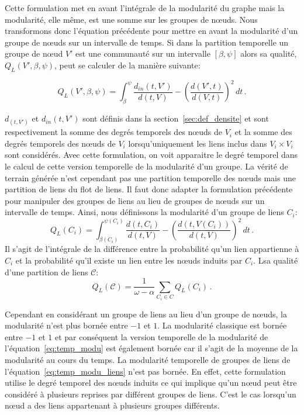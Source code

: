 Cette formulation met en avant l'intégrale de la modularité du graphe mais la modularité, elle même, est une somme sur les groupes de n\oe uds.
Nous transformons donc l'équation précédente pour mettre en avant la modularité d'un groupe de n\oe uds sur un intervalle de temps.
Si dans la partition temporelle un groupe de n\oe ud $V'$ est une communauté sur un intervalle $[\beta, \psi]$ alors sa qualité,$Q_L(V', \beta, \psi)$, peut se calculer de la manière suivante:

\begin{equation}
Q_L(V', \beta, \psi)  = \int_{\beta}^{\psi} \! \dfrac{d_{in}(t,V')}{d(t,V)} - \left( \dfrac{d(V',t)}{d(V,t)} \right)^2  \, dt\, .
\end{equation}

$d_(t,V')$ et $d_{in}(t,V')$ sont définis dans la section~\ref{sec:def_densite} et sont respectivement la somme des degrés temporels des n\oe uds de $V_i$ et la somme des degrés temporels des n\oe uds de $V_i$ lorsqu'uniquement les liens inclus dans $V_i \times V_i$ sont considérés.
Avec cette formulation, on voit apparaitre le degré temporel dans le calcul de cette version temporelle de la modularité d'un groupe.
La vérité de terrain générée n'est cependant pas une partition temporelle des n\oe uds mais une partition de liens du flot de liens.
Il faut donc adapter la formulation précédente pour manipuler des groupes de liens au lieu de groupes de n\oe uds sur un intervalle de temps.
Ainsi, nous définissons la modularité d'un groupe de liens $C_i$:
\begin{equation}
Q_L(C_i)  = \int_{\beta(C_i)}^{\psi(C_i)} \! \dfrac{d(t,C_i)}{d(t,V)} -  \left( \dfrac{d(t,V(C_i))}{d(t,V)} \right)^2 \, dt \,.
\label{}
\end{equation}
Il s'agit de l'intégrale de la différence entre la probabilité qu'un lien appartienne à $C_i$ et la probabilité qu'il existe un lien entre les n\oe uds induits par $C_i$.
Lsa qualité d'une partition de liens $\mathcal{C}$:
\begin{equation}
Q_L(\mathcal{C}) = \dfrac{1}{\omega-\alpha} \sum_{C_i \in C} Q_L(C_i)\, .
\label{eq:temp_modu_liens}
\end{equation}

Cependant en considérant un groupe de liens au lieu d'un groupe de n\oe uds, la modularité n'est plus bornée entre $-1$ et $1$.
La modularité classique est bornée entre $-1$ et $1$ et par conséquent la version temporelle de la modularité de l'équation~\ref{eq:temp_modu} est également bornée car il s'agit de la moyenne de la modularité au cours du temps.
La modularité temporelle de groupes de liens de l'équation~\ref{eq:temp_modu_liens} n'est pas bornée.
En effet, cette formulation utilise le degré temporel des n\oe uds induits ce qui implique qu'un n\oe ud peut être considéré à plusieurs reprises par différent groupes de liens.
C'est le cas lorsqu'un n\oe ud a des liens appartenant à plusieurs groupes différents.

